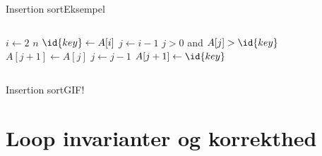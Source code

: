 \documentclass{beamer}
\begin{document}
\begin{frame}[fragile]{Insertion sort}{Eksempel}
\begin{columns}

        \begin{minipage}{\textwidth}%
            \small

            \vspace{-\abovedisplayskip}
            \begin{codebox}
                \li \For $i \gets 2$ \To $n$ \Do
                    \li $\id{key} \gets A[i]$
                    \li $j \gets i - 1$
                    \li \While $j > 0$ and $A[j] > \id{key}$ \Do
                        \li $A[j+1] \gets A[j]$
                        \li $j \gets j - 1$
                    \End
                    \li $A[j+1] \gets \id{key}$
                \End
            \end{codebox}
            
        \end{minipage}

    \end{columns}

\end{frame}

\begin{frame}{Insertion sort}{GIF!}
    \centering
\end{frame}

\section{Loop invarianter og korrekthed}
\end{document}
